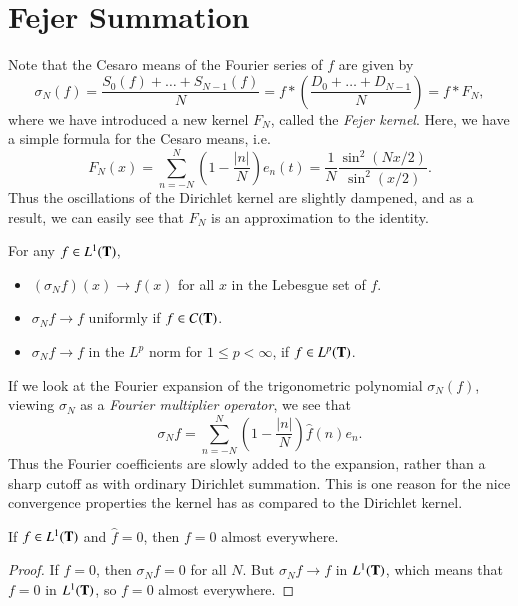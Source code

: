 \section{Fejer Summation}

Note that the Cesaro means of the Fourier series of $f$ are given by
%
\[ \sigma_N(f) = \frac{S_0(f) + \dots + S_{N-1}(f)}{N} = f * \left( \frac{D_0 + \dots + D_{N-1}}{N} \right) = f * F_N, \]
%
where we have introduced a new kernel $F_N$, called the \emph{Fejer kernel}. Here, we have a simple formula for the Cesaro means, i.e.
%
\[ F_N(x) = \sum_{n = -N}^N \left( 1 - \frac{|n|}{N} \right) e_n(t) = \frac{1}{N} \frac{\sin^2(Nx/2)}{\sin^2(x/2)}. \]
%
Thus the oscillations of the Dirichlet kernel are slightly dampened, and as a result, we can easily see that $F_N$ is an approximation to the identity.

\begin{theorem} For any $f \in L^1(\operatorname{\mathbf{T}})$,
    \begin{itemize}
        \item $(\sigma_N f)(x) \to f(x)$ for all $x$ in the Lebesgue set of $f$.
        \item $\sigma_N f \to f$ uniformly if $f \in C(\operatorname{\mathbf{T}})$.
        \item $\sigma_N f \to f$ in the $L^p$ norm for $1 \leq p < \infty$, if $f \in L^p(\operatorname{\mathbf{T}})$.
    \end{itemize}

\end{theorem}

If we look at the Fourier expansion of the trigonometric polynomial $\sigma_N(f)$, viewing $\sigma_N$ as a \emph{Fourier multiplier operator}, we see that
%
\[ \sigma_N f = \sum_{n = -N}^N \left( 1 - \frac{|n|}{N} \right) \widehat{f}(n) e_n. \]
%
Thus the Fourier coefficients are slowly added to the expansion, rather than a sharp cutoff as with ordinary Dirichlet summation. This is one reason for the nice convergence properties the kernel has as compared to the Dirichlet kernel.

\begin{corollary}
    If $f \in L^1(\operatorname{\mathbf{T}})$ and $\widehat{f} = 0$, then $f = 0$ almost everywhere.
\end{corollary}
\begin{proof}
    If $\widehat{f} = 0$, then $\sigma_N f = 0$ for all $N$. But $\sigma_N f \to f$ in $L^1(\operatorname{\mathbf{T}})$, which means that $f = 0$ in $L^1(\operatorname{\mathbf{T}})$, so $f = 0$ almost everywhere.
\end{proof}

